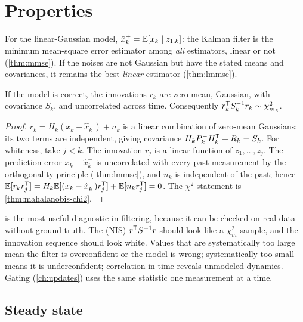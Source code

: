 \section{Properties}

\begin{proposition}[Optimality]
For the linear-Gaussian model, $\hat x_k^+ = \mathbb{E}[x_k\mid z_{1:k}]$: the Kalman filter is the minimum mean-square error estimator among \emph{all} estimators,
linear or not (\cref{thm:mmse}). If the noises are not Gaussian but have the stated means and covariances, it remains the best \emph{linear}
estimator (\cref{thm:lmmse}).
\end{proposition}

\begin{proposition}
\label{prop:innovation}
If the model is correct, the innovations $r_k$ are zero-mean, Gaussian, with covariance $S_k$, and uncorrelated across time. Consequently
$r_k^{\mathsf{T}} S_k^{-1} r_k \sim \chi^2_{m_k}$.
\end{proposition}
\begin{proof}
$r_k = H_k(x_k - \hat x_k^-) + n_k$ is a linear combination of zero-mean Gaussians; its two terms are independent, giving covariance
$H_kP_k^-H_k^{\mathsf{T}} + R_k = S_k$. For whiteness, take $j < k$. The innovation $r_j$ is a linear function of $z_1, \dots, z_j$. The prediction error
$x_k - \hat x_k^-$ is uncorrelated with every past measurement by the orthogonality principle (\cref{thm:lmmse}), and $n_k$ is independent of the past;
hence $\mathbb{E}[r_kr_j^{\mathsf{T}}] = H_k\mathbb{E}[(x_k - \hat x_k^-)r_j^{\mathsf{T}}] + \mathbb{E}[n_kr_j^{\mathsf{T}}] = 0$. The $\chi^2$ statement is \cref{thm:mahalanobis-chi2}.
\end{proof}

 is the most useful diagnostic in filtering, because it can be checked on real data without ground truth. The  (NIS) $r^{\mathsf{T}} S^{-1} r$ should look like a $\chi^2_m$ sample, and the innovation sequence should look white. Values that are
systematically too large mean the filter is overconfident or the model is wrong; systematically too small means it is underconfident;
correlation in time reveals unmodeled dynamics. Gating (\cref{ch:updates}) uses the same statistic one measurement at a time.

\subsection{Steady state}

